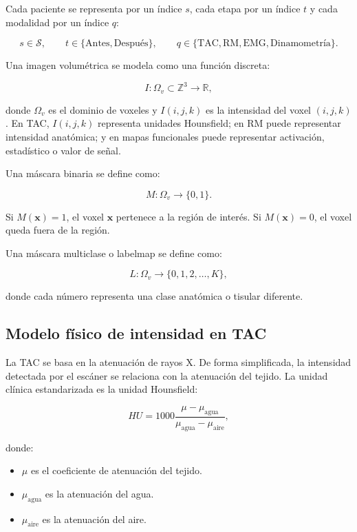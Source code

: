 \documentclass[12pt,a4paper]{article}
\begin{document}
Cada paciente se representa por un índice \(s\), cada etapa por un índice \(t\) y cada modalidad por un índice \(q\):

\[
s \in \mathcal{S},
\qquad
t \in \{\text{Antes},\text{Después}\},
\qquad
q \in \{\text{TAC},\text{RM},\text{EMG},\text{Dinamometría}\}.
\]

Una imagen volumétrica se modela como una función discreta:

\[
I:\Omega_v \subset \mathbb{Z}^3 \rightarrow \mathbb{R},
\]

donde \(\Omega_v\) es el dominio de voxeles y \(I(i,j,k)\) es la intensidad del voxel \((i,j,k)\). En TAC, \(I(i,j,k)\) representa unidades Hounsfield; en RM puede representar intensidad anatómica; y en mapas funcionales puede representar activación, estadístico o valor de señal.

Una máscara binaria se define como:

\[
M:\Omega_v \rightarrow \{0,1\}.
\]

Si \(M(\mathbf{x})=1\), el voxel \(\mathbf{x}\) pertenece a la región de interés. Si \(M(\mathbf{x})=0\), el voxel queda fuera de la región.

Una máscara multiclase o labelmap se define como:

\[
L:\Omega_v \rightarrow \{0,1,2,\ldots,K\},
\]

donde cada número representa una clase anatómica o tisular diferente.

\subsection{Modelo físico de intensidad en TAC}

La TAC se basa en la atenuación de rayos X. De forma simplificada, la intensidad detectada por el escáner se relaciona con la atenuación del tejido. La unidad clínica estandarizada es la unidad Hounsfield:

\[
HU =
1000
\frac{\mu-\mu_{\text{agua}}}
{\mu_{\text{agua}}-\mu_{\text{aire}}},
\]

donde:

\begin{itemize}
    \item \(\mu\) es el coeficiente de atenuación del tejido.
    \item \(\mu_{\text{agua}}\) es la atenuación del agua.
    \item \(\mu_{\text{aire}}\) es la atenuación del aire.
\end{itemize}
\end{document}

